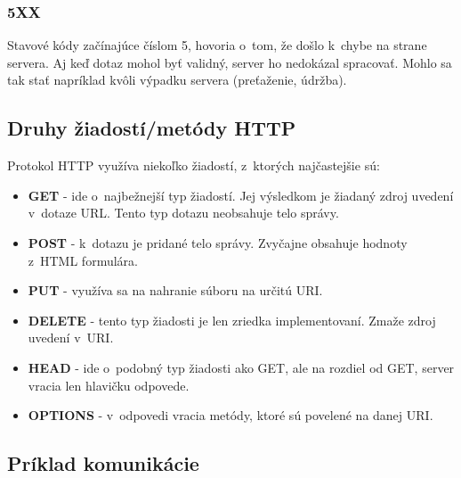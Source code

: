 \documentclass[slovak]{fitthesis}
\begin{document}
\label{5XX}
\subsubsection{5XX}
Stavové kódy začínajúce číslom 5, hovoria o~tom, že došlo k~chybe na strane servera. Aj keď dotaz mohol byť validný, server ho nedokázal spracovať. Mohlo sa tak stať napríklad kvôli výpadku servera (preťaženie, údržba).

\subsection{Druhy žiadostí/metódy HTTP}
Protokol HTTP využíva niekoľko žiadostí, z~ktorých najčastejšie sú:
\begin{itemize}
    \item \textbf{GET} - ide o~najbežnejší typ žiadostí. Jej výsledkom je žiadaný zdroj uvedení v~dotaze URL. Tento typ dotazu neobsahuje telo správy.
    \item \textbf{POST} - k~dotazu je pridané telo správy. Zvyčajne obsahuje hodnoty z~HTML formulára.
    \item \textbf{PUT} - využíva sa na nahranie súboru na určitú URI.
    \item \textbf{DELETE} - tento typ žiadosti je len zriedka implementovaní. Zmaže zdroj uvedení v~URI.
    \item \textbf{HEAD} - ide o~podobný typ žiadosti ako GET, ale na rozdiel od GET, server vracia len hlavičku odpovede.
    \item \textbf{OPTIONS} - v~odpovedi vracia metódy, ktoré sú povelené na danej URI.
\end{itemize}




\newpage

\subsection{Príklad komunikácie}
\end{document}
